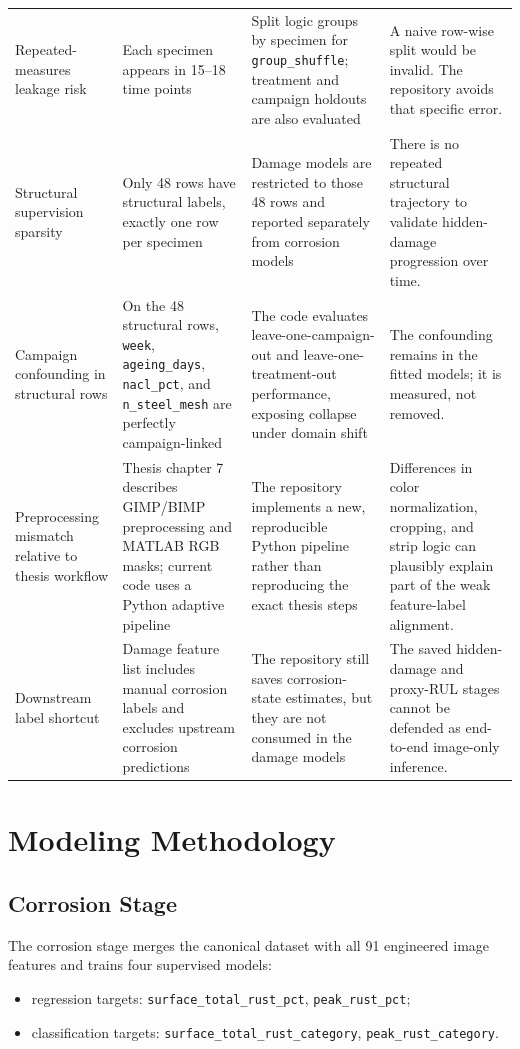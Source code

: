 \documentclass[11pt,a4paper]{article}
\begin{document}
\begin{longtable}{P{3.2cm}P{3.2cm}P{3.5cm}P{4.8cm}}
Repeated-measures leakage risk & Each specimen appears in 15--18 time points & Split logic groups by specimen for \texttt{group\_shuffle}; treatment and campaign holdouts are also evaluated & A naive row-wise split would be invalid. The repository avoids that specific error. \\
Structural supervision sparsity & Only 48 rows have structural labels, exactly one row per specimen & Damage models are restricted to those 48 rows and reported separately from corrosion models & There is no repeated structural trajectory to validate hidden-damage progression over time. \\
Campaign confounding in structural rows & On the 48 structural rows, \texttt{week}, \texttt{ageing\_days}, \texttt{nacl\_pct}, and \texttt{n\_steel\_mesh} are perfectly campaign-linked & The code evaluates leave-one-campaign-out and leave-one-treatment-out performance, exposing collapse under domain shift & The confounding remains in the fitted models; it is measured, not removed. \\
Preprocessing mismatch relative to thesis workflow & Thesis chapter 7 describes GIMP/BIMP preprocessing and MATLAB RGB masks; current code uses a Python adaptive pipeline & The repository implements a new, reproducible Python pipeline rather than reproducing the exact thesis steps & Differences in color normalization, cropping, and strip logic can plausibly explain part of the weak feature-label alignment. \\
Downstream label shortcut & Damage feature list includes manual corrosion labels and excludes upstream corrosion predictions & The repository still saves corrosion-state estimates, but they are not consumed in the damage models & The saved hidden-damage and proxy-RUL stages cannot be defended as end-to-end image-only inference. \\
\end{longtable}

\section{Modeling Methodology}

\subsection{Corrosion Stage}

The corrosion stage merges the canonical dataset with all 91 engineered image features and trains four supervised models:
\begin{itemize}
  \item regression targets: \texttt{surface\_total\_rust\_pct}, \texttt{peak\_rust\_pct};
  \item classification targets: \texttt{surface\_total\_rust\_category}, \texttt{peak\_rust\_category}.
\end{itemize}
\end{document}
